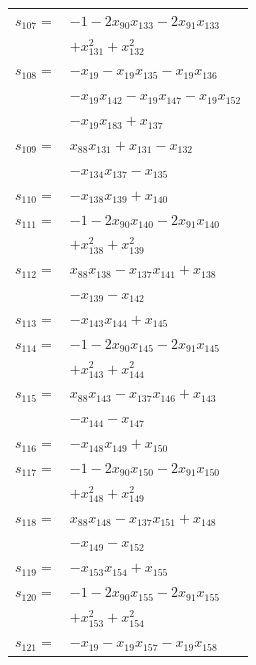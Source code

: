 \begin{longtable}{@{}r@{\;}l@{}}
\(s_{107}=\) & \(\displaystyle -1 -2x_{90}x_{133} -2x_{91}x_{133}\) \\
 & \(\displaystyle +x_{131}^{2} +x_{132}^{2}\) \\[3pt]
\(s_{108}=\) & \(\displaystyle -x_{19} -x_{19}x_{135} -x_{19}x_{136}\) \\
 & \(\displaystyle -x_{19}x_{142} -x_{19}x_{147} -x_{19}x_{152}\) \\
 & \(\displaystyle -x_{19}x_{183} +x_{137}\) \\[3pt]
\(s_{109}=\) & \(\displaystyle x_{88}x_{131} +x_{131} -x_{132}\) \\
 & \(\displaystyle -x_{134}x_{137} -x_{135}\) \\[3pt]
\(s_{110}=\) & \(\displaystyle -x_{138}x_{139} +x_{140}\) \\[3pt]
\(s_{111}=\) & \(\displaystyle -1 -2x_{90}x_{140} -2x_{91}x_{140}\) \\
 & \(\displaystyle +x_{138}^{2} +x_{139}^{2}\) \\[3pt]
\(s_{112}=\) & \(\displaystyle x_{88}x_{138} -x_{137}x_{141} +x_{138}\) \\
 & \(\displaystyle -x_{139} -x_{142}\) \\[3pt]
\(s_{113}=\) & \(\displaystyle -x_{143}x_{144} +x_{145}\) \\[3pt]
\(s_{114}=\) & \(\displaystyle -1 -2x_{90}x_{145} -2x_{91}x_{145}\) \\
 & \(\displaystyle +x_{143}^{2} +x_{144}^{2}\) \\[3pt]
\(s_{115}=\) & \(\displaystyle x_{88}x_{143} -x_{137}x_{146} +x_{143}\) \\
 & \(\displaystyle -x_{144} -x_{147}\) \\[3pt]
\(s_{116}=\) & \(\displaystyle -x_{148}x_{149} +x_{150}\) \\[3pt]
\(s_{117}=\) & \(\displaystyle -1 -2x_{90}x_{150} -2x_{91}x_{150}\) \\
 & \(\displaystyle +x_{148}^{2} +x_{149}^{2}\) \\[3pt]
\(s_{118}=\) & \(\displaystyle x_{88}x_{148} -x_{137}x_{151} +x_{148}\) \\
 & \(\displaystyle -x_{149} -x_{152}\) \\[3pt]
\(s_{119}=\) & \(\displaystyle -x_{153}x_{154} +x_{155}\) \\[3pt]
\(s_{120}=\) & \(\displaystyle -1 -2x_{90}x_{155} -2x_{91}x_{155}\) \\
 & \(\displaystyle +x_{153}^{2} +x_{154}^{2}\) \\[3pt]
\(s_{121}=\) & \(\displaystyle -x_{19} -x_{19}x_{157} -x_{19}x_{158}\) \\

\end{longtable}

